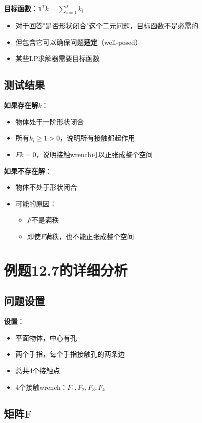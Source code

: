 \documentclass[12pt,a4paper]{article}
\begin{document}
\textbf{目标函数}：$\mathbf{1}^T k = \sum_{i=1}^j k_i$
\begin{itemize}
\item 对于回答"是否形状闭合"这个二元问题，目标函数不是必需的
\item 但包含它可以确保问题\textbf{适定}（well-posed）
\item 某些LP求解器需要目标函数
\end{itemize}

\subsection{测试结果}

\textbf{如果存在解$k$}：
\begin{itemize}
\item 物体处于一阶形状闭合
\item 所有$k_i \geq 1 > 0$，说明所有接触都起作用
\item $F k = 0$，说明接触wrench可以正张成整个空间
\end{itemize}

\textbf{如果不存在解}：
\begin{itemize}
\item 物体不处于形状闭合
\item 可能的原因：
  \begin{itemize}
  \item $F$不是满秩
  \item 即使$F$满秩，也不能正张成整个空间
  \end{itemize}
\end{itemize}

\section{例题12.7的详细分析}

\subsection{问题设置}

\textbf{设置}：
\begin{itemize}
\item 平面物体，中心有孔
\item 两个手指，每个手指接触孔的两条边
\item 总共4个接触点
\item 4个接触wrench：$F_1, F_2, F_3, F_4$
\end{itemize}

\subsection{矩阵F}
\end{document}
